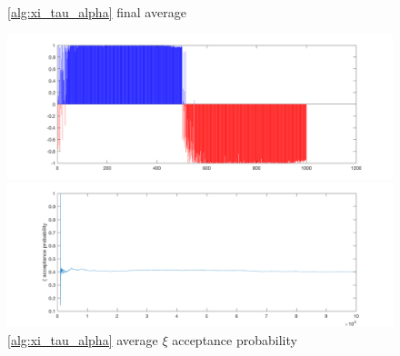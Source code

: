 \documentclass{siamart1116}
\begin{document}
\begin{figure}[!htb]
    \begin{minipage}{0.48\textwidth}
        \centering
        \caption{\label{fig:moon_noncentered_avg} \cref{alg:xi_tau_alpha} final average}
        \includegraphics[width=\linewidth]{graphics/moons/noncentered/final_avg.png}
    \end{minipage} \hfill
    \begin{minipage}{0.48\textwidth}
        \centering
        \caption{\label{fig:moon_noncentered_accept} \cref{alg:xi_tau_alpha} average $\xi$ acceptance probability}
        \includegraphics[width=\linewidth]{graphics/moons/noncentered/acceptance_xi_probability.png}
    \end{minipage}
\end{figure}
\end{document}
